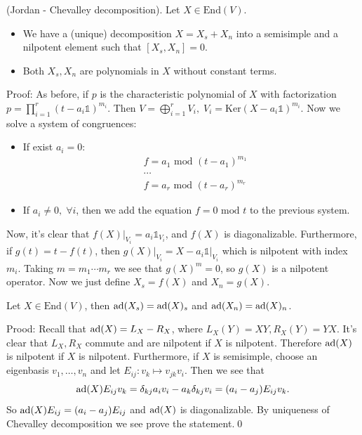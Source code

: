 \begin{dang}
    \begin{theorem}
        (Jordan - Chevalley decomposition). Let $X\in\text{End}(V)$.
        \begin{itemize}
            \item[(1)] We have a (unique) decomposition $X=X_s+X_n$ into a semisimple and a nilpotent element such that 
            $[X_s,X_n]=0$.
            \item[(2)] Both $X_s,X_n$ are polynomials in $X$ without constant terms.
        \end{itemize}
    \end{theorem}
\end{dang}
Proof: As before, if $p$ is the characteristic polynomial of $X$ with factorization $p=\prod_{i=1}^r(t-a_i\mathds{1})^{m_i}$. 
Then $V=\bigoplus_{i=1}^rV_i,\;V_i=\text{Ker}(X-a_i\mathds{1})^{m_i}$. Now we solve a system of congruences:
\begin{itemize}
    \item If exist $a_i=0$:
    \begin{equation}
        \begin{split}
            & f = a_1 \text{ mod } (t - a_1)^{m_1}\\
            &\cdots\\
            & f = a_r \text{ mod }(t-a_r)^{m_r}
        \end{split}
    \end{equation}
    \item If $a_i\neq0,\;\forall i$, then we add the equation $f=0\text{ mod }t$ to the previous system.
\end{itemize}

Now, it's clear that $f(X)|_{V_i}=a_i\mathds{1}_{V_i}$, and $f(X)$ is diagonalizable. Furthermore, if $g(t)=t-f(t)$, then 
$g(X)|_{V_i}= X-a_i\mathds{1}\big|_{V_i}$ which is nilpotent with index $m_i$. Taking $m = m_1\cdots m_r$ we see that 
$g(X)^m=0$, so $g(X)$ is a nilpotent operator. Now we just define $X_s=f(X)$ and $X_n=g(X)$. 


\begin{dang}
    \begin{lemma}
        Let $X\in\text{End}(V)$, then $\text{ad}(X_s)=\text{ad}(X)_s$ and $\text{ad}(X_n)=\text{ad}(X)_n$.
    \end{lemma}
\end{dang}
Prood: Recall that $\text{ad}(X)=L_X-R_X$, where $L_X(Y)=XY,R_X(Y)=YX$. It's clear that $L_X,R_X$ commute and are nilpotent if
$X$ is nilpotent. Therefore $\text{ad}(X)$ is nilpotent if $X$ is nilpotent. Furthermore, if $X$ is semisimple,
choose an eigenbasis $v_1,\dots, v_n$ and let $E_{ij}:v_k\mapsto v_{jk}v_i$. Then we see that 
\begin{equation}
    \text{ad}(X)E_{ij}v_k = \delta_{kj}a_i v_i-a_k\delta_{kj}v_i = (a_i-a_j)E_{ij}v_k.
\end{equation}
So $\text{ad}(X)E_{ij}= (a_i-a_j)E_{ij}$ and $\text{ad}(X)$ is diagonalizable. By uniqueness of Chevalley decomposition we see prove the 
statement.\qed

